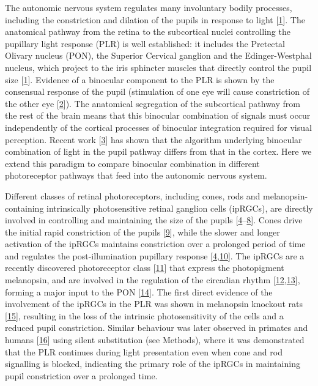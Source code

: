 \documentclass[
]{article}
\begin{document}
The autonomic nervous system regulates many involuntary bodily processes, including the constriction and dilation of the pupils in response to light {[}\protect\hyperlink{ref-McDougal2015}{1}{]}. The anatomical pathway from the retina to the subcortical nuclei controlling the pupillary light response (PLR) is well established: it includes the Pretectal Olivary nucleus (PON), the Superior Cervical ganglion and the Edinger-Westphal nucleus, which project to the iris sphincter muscles that directly control the pupil size {[}\protect\hyperlink{ref-McDougal2015}{1}{]}. Evidence of a binocular component to the PLR is shown by the consensual response of the pupil (stimulation of one eye will cause constriction of the other eye {[}\protect\hyperlink{ref-Wyatt1981}{2}{]}). The anatomical segregation of the subcortical pathway from the rest of the brain means that this binocular combination of signals must occur independently of the cortical processes of binocular integration required for visual perception. Recent work {[}\protect\hyperlink{ref-Segala2023}{3}{]} has shown that the algorithm underlying binocular combination of light in the pupil pathway differs from that in the cortex. Here we extend this paradigm to compare binocular combination in different photoreceptor pathways that feed into the autonomic nervous system.

Different classes of retinal photoreceptors, including cones, rods and melanopsin-containing intrinsically photosensitive retinal ganglion cells (ipRGCs), are directly involved in controlling and maintaining the size of the pupils {[}\protect\hyperlink{ref-McDougal2010}{4}--\protect\hyperlink{ref-Woelders2018}{8}{]}. Cones drive the initial rapid constriction of the pupils {[}\protect\hyperlink{ref-Mathot2018}{9}{]}, while the slower and longer activation of the ipRGCs maintains constriction over a prolonged period of time and regulates the post-illumination pupillary response {[}\protect\hyperlink{ref-McDougal2010}{4},\protect\hyperlink{ref-Markwell2010}{10}{]}. The ipRGCs are a recently discovered photoreceptor class {[}\protect\hyperlink{ref-Provencio2000}{11}{]} that express the photopigment melanopsin, and are involved in the regulation of the circadian rhythm {[}\protect\hyperlink{ref-Panda2002}{12},\protect\hyperlink{ref-Ruby2002}{13}{]}, forming a major input to the PON {[}\protect\hyperlink{ref-Dacey2003}{14}{]}. The first direct evidence of the involvement of the ipRGCs in the PLR was shown in melanopsin knockout rats {[}\protect\hyperlink{ref-Lucas2003}{15}{]}, resulting in the loss of the intrinsic photosensitivity of the cells and a reduced pupil constriction. Similar behaviour was later observed in primates and humans {[}\protect\hyperlink{ref-Gamlin2007}{16}{]} using silent substitution (see Methods), where it was demonstrated that the PLR continues during light presentation even when cone and rod signalling is blocked, indicating the primary role of the ipRGCs in maintaining pupil constriction over a prolonged time.
\end{document}

